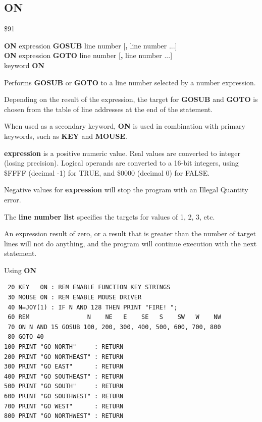 \subsection{ON}
\begin{description}[leftmargin=2cm,style=nextline]
\item [Token:]    \$91

\item [Format:]   {\bf ON} expression {\bf GOSUB} line number [{\bf,} line number ...] \\
                  {\bf ON} expression {\bf GOTO} line number [{\bf,} line number ...] \\
                  keyword {\bf ON}

\item [Usage:]    Performs {\bf GOSUB} or {\bf GOTO} to a line number selected by a number expression.

                  Depending on the result of the expression, the target for {\bf GOSUB} and {\bf GOTO} is chosen from the table of line addresses at the end of the statement.

                  When used as a secondary keyword, {\bf ON} is used in combination with primary keywords, such as {\bf KEY} and {\bf MOUSE}.

                  {\bf expression} is a positive numeric value. Real values are converted to integer (losing precision). Logical operands are converted to a 16-bit integers, using \$FFFF (decimal -1) for TRUE, and \$0000 (decimal 0) for FALSE.

\item [Remarks:]  Negative values for {\bf expression} will stop the program with an Illegal Quantity error. 

                  The {\bf line number list} specifies the targets for values of 1, 2, 3, etc.
                 
                  An expression result of zero, or a result that is greater than the number of target lines will not do anything, and the program will continue execution with the next statement.

\item [Example:]  Using {\bf ON}

\begin{tcolorbox}[colback=black,coltext=white]
\verbatimfont{\codefont}
\begin{verbatim}
 20 KEY   ON : REM ENABLE FUNCTION KEY STRINGS
 30 MOUSE ON : REM ENABLE MOUSE DRIVER
 40 N=JOY(1) : IF N AND 128 THEN PRINT "FIRE! ";
 60 REM                N    NE   E    SE   S    SW   W    NW
 70 ON N AND 15 GOSUB 100, 200, 300, 400, 500, 600, 700, 800
 80 GOTO 40
100 PRINT "GO NORTH"     : RETURN
200 PRINT "GO NORTHEAST" : RETURN
300 PRINT "GO EAST"      : RETURN
400 PRINT "GO SOUTHEAST" : RETURN
500 PRINT "GO SOUTH"     : RETURN
600 PRINT "GO SOUTHWEST" : RETURN
700 PRINT "GO WEST"      : RETURN
800 PRINT "GO NORTHWEST" : RETURN
\end{verbatim}
\end{tcolorbox}
\end{description}

